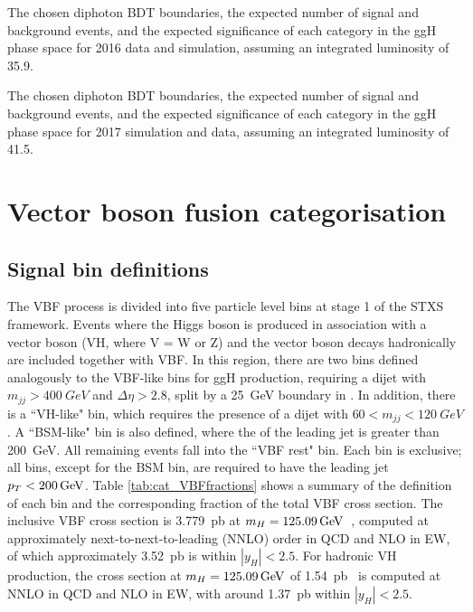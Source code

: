 \begin{table}
  \begin{centering}
    
    \caption{The chosen diphoton BDT boundaries, 
    the expected number of signal and background events, 
    and the expected significance of each category in the ggH phase space 
    for 2016 data and simulation, assuming an integrated luminosity of \SI{35.9}{\fbinv}.}
    \label{tab:cat_ggHsignificance2016}
  \end{centering}
\end{table}

\begin{table}
  \begin{centering}
    
    \caption{The chosen diphoton BDT boundaries, 
    the expected number of signal and background events, 
    and the expected significance of each category in the ggH phase space 
    for 2017 simulation and data, assuming an integrated luminosity of \SI{41.5}{\fbinv}.}
    \label{tab:cat_ggHsignificance2017}
  \end{centering}
\end{table}

\section{Vector boson fusion categorisation}
\subsection{Signal bin definitions}

The VBF process is divided into five particle level bins at stage 1 of the STXS framework.
Events where the Higgs boson is produced in association with a vector boson (VH, where V = W or Z) 
and the vector boson decays hadronically are included together with VBF.
In this region, there are two bins defined analogously to the VBF-like bins for ggH production, 
requiring a dijet with $m_{jj} > \SI{400}{GeV}$ and $\Delta\eta > 2.8$, 
split by a \SI{25}{GeV} boundary in \ptHjj.
In addition, there is a ``VH-like" bin, 
which requires the presence of a dijet with $60 < m_{jj} < \SI{120}{GeV}$. 
A ``BSM-like" bin is also defined, where the \pt of the leading jet is greater than \SI{200}{GeV}.
All remaining events fall into the ``VBF rest" bin.
Each bin is exclusive; all bins, except for the BSM bin, 
are required to have the leading jet $p_T < \SI{200}{GeV}$.
Table \ref{tab:cat_VBFfractions} shows a summary of the definition of each bin 
and the corresponding fraction of the total VBF cross section.
The inclusive VBF cross section is \SI{3.779}{pb} at $m_{H} = \SI{125.09}{GeV}$~\cite{YR4},
computed at approximately next-to-next-to-leading (NNLO) order in QCD and NLO in EW,
of which approximately \SI{3.52}{pb} is within $|y_H| < 2.5$.
For hadronic VH production, 
the cross section at $m_{H} = \SI{125.09}{GeV}$ of \SI{1.54}{pb}~\cite{YR4}
is computed at NNLO in QCD and NLO in EW, 
with around \SI{1.37}{pb} within $|y_H| < 2.5$.

